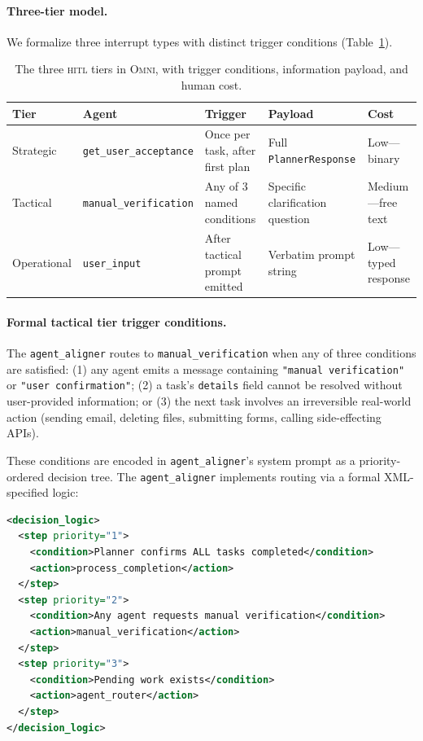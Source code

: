 \documentclass[11pt,a4paper]{article}
\newcommand{\omni}{\textsc{Omni}}
\newcommand{\hitl}{\textsc{hitl}}
\begin{document}
\paragraph{Three-tier model.} We formalize three interrupt types with distinct trigger conditions (Table~\ref{tab:hitl_tiers}).

\begin{table}[h]
\centering
\caption{The three \hitl{} tiers in \omni{}, with trigger conditions, information payload, and human cost.}
\label{tab:hitl_tiers}
\small
\begin{tabular}{lllll}
\toprule
\textbf{Tier} & \textbf{Agent} & \textbf{Trigger} & \textbf{Payload} & \textbf{Cost} \\
\midrule
Strategic & \texttt{get\_user\_acceptance} & Once per task, after first plan & Full \texttt{PlannerResponse} & Low---binary \\
Tactical & \texttt{manual\_verification} & Any of 3 named conditions & Specific clarification question & Medium---free text \\
Operational & \texttt{user\_input} & After tactical prompt emitted & Verbatim prompt string & Low---typed response \\
\bottomrule
\end{tabular}
\end{table}

\paragraph{Formal tactical tier trigger conditions.} The \texttt{agent\_aligner} routes to \texttt{manual\_verification} when any of three conditions are satisfied: (1) any agent emits a message containing \texttt{"manual verification"} or \texttt{"user confirmation"}; (2) a task's \texttt{details} field cannot be resolved without user-provided information; or (3) the next task involves an irreversible real-world action (sending email, deleting files, submitting forms, calling side-effecting APIs).

These conditions are encoded in \texttt{agent\_aligner}'s system prompt as a priority-ordered decision tree. The \texttt{agent\_aligner} implements routing via a formal XML-specified logic:

\begin{lstlisting}[language=XML]
<decision_logic>
  <step priority="1">
    <condition>Planner confirms ALL tasks completed</condition>
    <action>process_completion</action>
  </step>
  <step priority="2">
    <condition>Any agent requests manual verification</condition>
    <action>manual_verification</action>
  </step>
  <step priority="3">
    <condition>Pending work exists</condition>
    <action>agent_router</action>
  </step>
</decision_logic>
\end{lstlisting}
\end{document}
